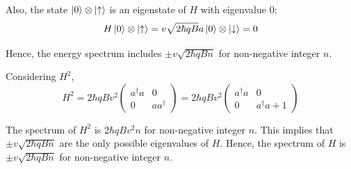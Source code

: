 \documentclass[a4paper,11pt]{article}
\begin{document}
Also, the state $\ket{0} \otimes \ket{\uparrow}$ is an eigenstate of $H$ with eigenvalue $0$:
\begin{equation}
  H \ket{0} \otimes \ket{\uparrow} = v\sqrt{2\hbar qB} a \ket{0} \otimes \ket{\downarrow} = 0
\end{equation}

Hence, the energy spectrum includes $\pm v\sqrt{2\hbar qBn}$ for non-negative integer $n$.

Considering $H^2$, 
\begin{equation}
  H^2 = 2\hbar qB v^2 \begin{pmatrix}
  a^\dagger a & 0 \\
  0 & a a^\dagger
  \end{pmatrix} = 2\hbar qB v^2 \begin{pmatrix}
  a^\dagger a & 0 \\
  0 & a^\dagger a + 1
  \end{pmatrix}
\end{equation}

The spectrum of $H^2$ is $2\hbar qB v^2 n$ for non-negative integer $n$. This implies that $\pm v\sqrt{2\hbar qBn}$ are the only possible eigenvalues of $H$. Hence, the spectrum of $H$ is $\pm v\sqrt{2\hbar qBn}$ for non-negative integer $n$.
\end{document}
